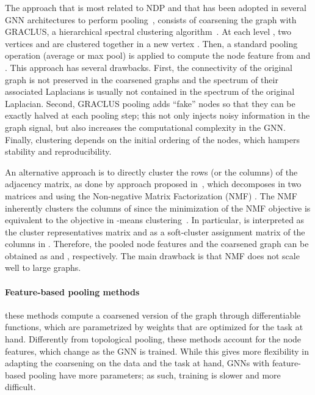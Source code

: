 \documentclass[journal]{IEEEtran}
\begin{document}
The approach that is most related to NDP and that has been adopted in several GNN architectures to perform pooling~\cite{bruna2013spectral, defferrard2016convolutional, monti2017geometric, fey2018splinecnn, levie2017cayleynets}, consists of coarsening the graph with GRACLUS, a hierarchical spectral clustering algorithm~\cite{dhillon2004kernel}. 
At each level , two vertices  and  are clustered together in a new vertex .
Then, a standard pooling operation (average or max pool) is applied to compute the node feature  from  and .
This approach has several drawbacks.
First, the connectivity of the original graph is not preserved in the coarsened graphs and the spectrum of their associated Laplacians is usually not contained in the spectrum of the original Laplacian.
Second, GRACLUS pooling adds ``fake'' nodes so that they can be exactly halved at each pooling step; this not only injects noisy information in the graph signal, but also increases the computational complexity in the GNN. Finally, clustering depends on the initial ordering of the nodes, which hampers stability and reproducibility.



An alternative approach is to directly cluster the rows (or the columns) of the adjacency matrix, as done by approach proposed in~\cite{bacciu2019non}, which decomposes  in two matrices  and  using the Non-negative Matrix Factorization (NMF) .
The NMF inherently clusters the columns of  since the minimization of the NMF objective is equivalent to the objective in -means clustering~\cite{ding2005equivalence}.
In particular,  is interpreted as the cluster representatives matrix and  as a soft-cluster assignment matrix of the columns in . 
Therefore, the pooled node features and the coarsened graph can be obtained as  and , respectively.
The main drawback is that NMF does not scale well to large graphs.



\paragraph{Feature-based pooling methods}
these methods compute a coarsened version of the graph through differentiable functions, which are parametrized by weights that are optimized for the task at hand.
Differently from topological pooling, these methods account for the node features, which change as the GNN is trained.
While this gives more flexibility in adapting the coarsening on the data and the task at hand, GNNs with feature-based pooling have more parameters; as such, training is slower and more difficult.
\end{document}
